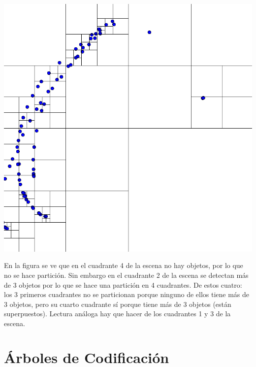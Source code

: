 \begin{minipage}{.3\textwidth}
\centerline{\includegraphics[width=1\textwidth]{input/06-Graph-fig/quadtree2}}
\end{minipage}
\hfill
\begin{minipage}{.65\textwidth}
En la figura  se ve que en el cuadrante 4 de la escena no hay objetos, por lo que no se hace partición.
Sin embargo en el cuadrante 2 de la escena se detectan más de 3 objetos por lo que se hace una partición en 4 cuadrantes. De estos cuatro: los 3 primeros cuadrantes no se particionan porque ninguno de ellos tiene más de 3 objetos, pero su cuarto cuadrante sí porque tiene más de 3 objetos (están superpuestos). Lectura análoga hay que hacer de los cuadrantes 1 y 3 de la escena.
\end{minipage}





%




\separacion
\section{Árboles de Codificación} 

